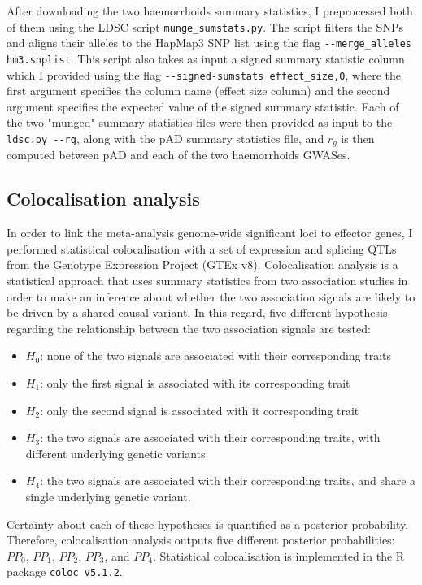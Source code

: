 After downloading the two haemorrhoids summary statistics, I preprocessed both of them using the LDSC script \Verb+munge_sumstats.py+. The script filters the SNPs and aligns their alleles to the HapMap3 SNP list using the flag \Verb+--merge_alleles hm3.snplist+. This script also takes as input a signed summary statistic column which I provided using the flag \Verb+--signed-sumstats effect_size,0+, where the first argument specifies the column name (effect size column) and the second argument specifies the expected value of the signed summary statistic. Each of the two "munged" summary statistics files were then provided as input to the \Verb+ldsc.py --rg+, along with the pAD summary statistics file, and $r_{g}$ is then computed between pAD and each of the two haemorrhoids GWASes. 


\subsection{Colocalisation analysis}
In order to link the meta-analysis genome-wide significant loci to effector genes, I performed statistical colocalisation with a set of expression and splicing QTLs from the Genotype Expression Project (GTEx v8). Colocalisation analysis is a statistical approach that uses summary statistics from two association studies in order to make an inference about whether the two association signals are likely to be driven by a shared causal variant. In this regard, five different hypothesis regarding the relationship between the two association signals are tested:
\begin{itemize}
  \item $H_{0}$: none of the two signals are associated with their corresponding traits
  \item $H_{1}$: only the first signal is associated with its corresponding trait
  \item $H_{2}$: only the second signal is associated with it corresponding trait
  \item $H_{3}$: the two signals are associated with their corresponding traits, with different underlying genetic variants
  \item $H_{4}$: the two signals are associated with their corresponding traits, and share a single underlying genetic variant.
\end{itemize}
Certainty about each of these hypotheses is quantified as a posterior probability. Therefore, colocalisation analysis outputs five different posterior probabilities: $PP_{0}$, $PP_{1}$, $PP_{2}$, $PP_{3}$, and $PP_{4}$. Statistical colocalisation is implemented in the R package \Verb+coloc v5.1.2+.\\

